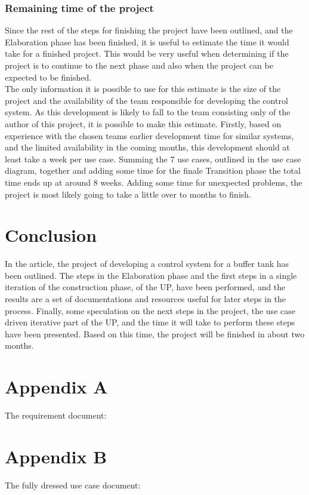 \documentclass[11pt, A4paper, english]{article}
\begin{document}
			\subsubsection{Remaining time of the project}
Since the rest of the steps for finishing the project have been outlined, and the Elaboration phase has been finished, it is useful to estimate the time it would take for a finished project. This would be very useful when determining if the project is to continue to the next phase and also when the project can be expected to be finished. \\
The only information it is possible to use for this estimate is the size of the project and the availability of the team responsible for developing the control system. As this development is likely to fall to the team consisting only of the author of this project, it is possible to make this estimate. Firstly, based on experience with the chosen teams earlier development time for similar systems, and the limited availability in the coming months, this development should at least take a week per use case. Summing the 7 use cases, outlined in the use case diagram, together and adding some time for the finale Transition phase the total time ends up at around 8 weeks. Adding some time for unexpected problems, the project is most likely going to take a little over to months to finish.

	\section{Conclusion}
In the article, the project of developing a control system for a buffer tank has been outlined. The steps in the Elaboration phase and the first steps in a single iteration of the construction phase, of the UP, have been performed, and the results are a set of documentations and resources useful for later steps in the process. Finally, some speculation on the next steps in the project, the use case driven iterative part of the UP, and the time it will take to perform these steps have been presented. Based on this time, the project will be finished in about two months.

\printbibliography

	\section{Appendix A}
The requirement document:


	\section{Appendix B}
The fully dressed use case document:

\end{document}
